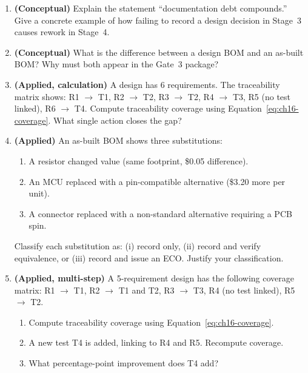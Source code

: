 \begin{enumerate}
  \item \textbf{(Conceptual)} Explain the statement ``documentation debt
        compounds.''
        Give a concrete example of how failing to record a design decision
        in Stage~3 causes rework in Stage~4.

  \item \textbf{(Conceptual)} What is the difference between a design BOM and
        an as-built BOM?
        Why must both appear in the Gate~3 package?

  \item \textbf{(Applied, calculation)} A design has 6 requirements.
        The traceability matrix shows: R1 $\to$ T1, R2 $\to$ T2, R3 $\to$ T2,
        R4 $\to$ T3, R5 (no test linked), R6 $\to$ T4.
        Compute traceability coverage using Equation~\ref{eq:ch16-coverage}.
        What single action closes the gap?

  \item \textbf{(Applied)} An as-built BOM shows three substitutions:
        \begin{enumerate}
          \item[(a)] A resistor changed value (same footprint, \$0.05
                difference).
          \item[(b)] An MCU replaced with a pin-compatible alternative
                (\$3.20 more per unit).
          \item[(c)] A connector replaced with a non-standard alternative
                requiring a PCB spin.
        \end{enumerate}
        Classify each substitution as: (i) record only, (ii) record and verify
        equivalence, or (iii) record and issue an ECO.
        Justify your classification.

  \item \textbf{(Applied, multi-step)} A 5-requirement design has the
        following coverage matrix: R1 $\to$ T1, R2 $\to$ T1 and T2, R3
        $\to$ T3, R4 (no test linked), R5 $\to$ T2.
        \begin{enumerate}
          \item[(a)] Compute traceability coverage using
                Equation~\ref{eq:ch16-coverage}.
          \item[(b)] A new test T4 is added, linking to R4 and R5.
                Recompute coverage.
          \item[(c)] What percentage-point improvement does T4 add?
        \end{enumerate}
\end{enumerate}

